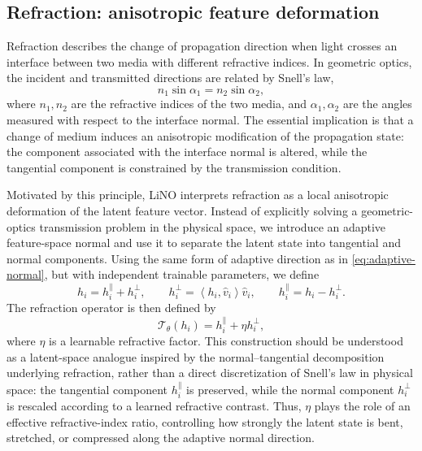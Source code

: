 \documentclass{article}
\newcommand{\cT}{\mathcal{T}}
\newcommand{\inner}[2]{\left\langle #1,#2\right\rangle}
\begin{document}
\subsection{Refraction: anisotropic feature deformation}

Refraction describes the change of propagation direction when light crosses an interface between two media with different refractive indices. In geometric optics, the incident and transmitted directions are related by Snell's law,
\begin{equation}
    n_1 \sin \alpha_1 = n_2 \sin \alpha_2,
\end{equation}
where $n_1,n_2$ are the refractive indices of the two media, and $\alpha_1,\alpha_2$ are the angles measured with respect to the interface normal. The essential implication is that a change of medium induces an anisotropic modification of the propagation state: the component associated with the interface normal is altered, while the tangential component is constrained by the transmission condition.

Motivated by this principle, LiNO interprets refraction as a local anisotropic deformation of the latent feature vector. Instead of explicitly solving a geometric-optics transmission problem in the physical space, we introduce an adaptive feature-space normal and use it to separate the latent state into tangential and normal components. Using the same form of adaptive direction as in \eqref{eq:adaptive-normal}, but with independent trainable parameters, we define
\begin{equation}
    h_i=h_i^{\parallel}+h_i^{\perp},
    \qquad
    h_i^{\perp}=\inner{h_i}{\widehat v_i}\widehat v_i,
    \qquad
    h_i^{\parallel}=h_i-h_i^{\perp}.
\end{equation}
The refraction operator is then defined by
\begin{equation}
    \cT_\theta(h_i)
    =
    h_i^{\parallel}+\eta h_i^{\perp},
    \label{eq:refraction}
\end{equation}
where $\eta$ is a learnable refractive factor. 
This construction should be understood as a latent-space analogue inspired by the normal–tangential decomposition underlying refraction, rather than a direct discretization of Snell's law in physical space: the tangential component $h_i^{\parallel}$ is preserved, while the normal component $h_i^{\perp}$ is rescaled according to a learned refractive contrast. Thus, $\eta$ plays the role of an effective refractive-index ratio, controlling how strongly the latent state is bent, stretched, or compressed along the adaptive normal direction.
\end{document}
